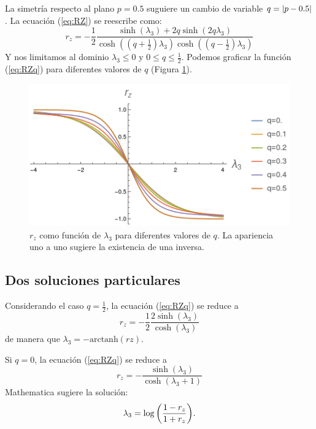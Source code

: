 La simetría respecto al plano $p=0.5$ suguiere un cambio de variable $q=\abs{p-0.5}$. La ecuación (\ref{eq:RZ}) se reescribe como:
\begin{equation}\label{eq:RZq}
r_{z}=-\frac{1}{2}\frac{\sinh(\lambda_{3})+2q\sinh(2q\lambda_{3})}{\cosh((q+\frac{1}{2})\lambda_{3})\cosh((q-\frac{1}{2})\lambda_{3})}
\end{equation}
Y nos limitamos al dominio $\lambda_{3}\leq0$ y $0\leq q\leq\frac{1}{2}$. Podemos graficar la función (\ref{eq:RZq}) para diferentes valores de $q$ (Figura \ref{fig:rzinv}).
\begin{figure}[h!]
\centering
\includegraphics[width=0.6\linewidth]{maxent/figures/rz_has_inverse_lambda-4to4.png}
\caption{$r_{z}$ como función de $\lambda_{3}$ para diferentes valores de $q$. La apariencia uno a uno sugiere la existencia de una inversa.}
\label{fig:rzinv}
\end{figure}

\subsection{Dos soluciones particulares}

Considerando el caso $q=\frac{1}{2}$, la ecuación (\ref{eq:RZq}) se reduce a 
\begin{equation}
r_z=-\frac{1}{2}\frac{2\sinh(\lambda_{3})}{\cosh(\lambda_{3})}
\end{equation}
de manera que $\lambda_{3}=-\text{arctanh}(rz)$.

Si $q=0$, la ecuación (\ref{eq:RZq}) se reduce a
\begin{equation}
r_z=-\frac{\sinh(\lambda_{3})}{\cosh(\lambda_{3}+1)}
\end{equation}
Mathematica sugiere la solución:
\begin{equation}\label{eq:lambda0.5}
\lambda_{3}=\log\qty(\frac{1-r_{z}}{1+r_{z}}).
\end{equation}